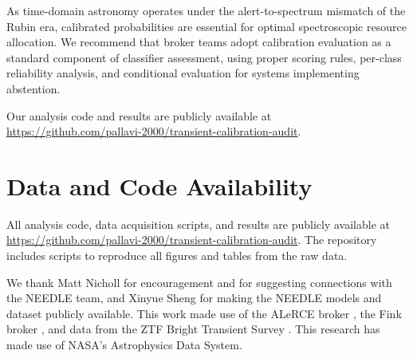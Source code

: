 \documentclass[twocolumn]{aastex631}
\begin{document}
As time-domain astronomy operates under the alert-to-spectrum mismatch of the Rubin era, calibrated probabilities are essential for optimal spectroscopic resource allocation. We recommend that broker teams adopt calibration evaluation as a standard component of classifier assessment, using proper scoring rules, per-class reliability analysis, and conditional evaluation for systems implementing abstention.

Our analysis code and results are publicly available at \url{https://github.com/pallavi-2000/transient-calibration-audit}.

\section*{Data and Code Availability}

All analysis code, data acquisition scripts, and results are publicly available at \url{https://github.com/pallavi-2000/transient-calibration-audit}. The repository includes scripts to reproduce all figures and tables from the raw data.

\begin{acknowledgments}
We thank Matt Nicholl for encouragement and for suggesting connections with the NEEDLE team, and Xinyue Sheng for making the NEEDLE models and dataset publicly available. This work made use of the ALeRCE broker \citep{forster2021}, the Fink broker \citep{moller2021}, and data from the ZTF Bright Transient Survey \citep{fremling2020, perley2020}. This research has made use of NASA's Astrophysics Data System.
\end{acknowledgments}






\end{document}
